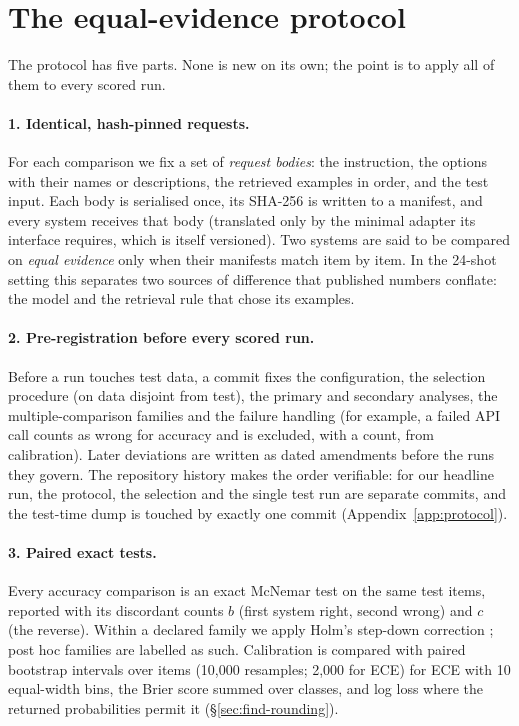 \section{The equal-evidence protocol}
\label{sec:protocol}

The protocol has five parts. None is new on its own; the point is to apply all of them to every scored run.

\paragraph{1. Identical, hash-pinned requests.} For each comparison we fix a set of \emph{request bodies}: the
instruction, the options with their names or descriptions, the retrieved examples in order, and the test input. Each
body is serialised once, its SHA-256 is written to a manifest, and every system receives that body (translated only
by the minimal adapter its interface requires, which is itself versioned). Two systems are said to be compared on
\emph{equal evidence} only when their manifests match item by item. In the 24-shot setting this separates two
sources of difference that published numbers conflate: the model and the retrieval rule that chose its examples.

\paragraph{2. Pre-registration before every scored run.} Before a run touches test data, a commit fixes the
configuration, the selection procedure (on data disjoint from test), the primary and secondary analyses, the
multiple-comparison families and the failure handling (for example, a failed API call counts as wrong for accuracy
and is excluded, with a count, from calibration). Later deviations are written as dated amendments before the runs
they govern. The repository history makes the order verifiable: for our headline run, the protocol, the selection
and the single test run are separate commits, and the test-time dump is touched by exactly one commit
(Appendix~\ref{app:protocol}).

\paragraph{3. Paired exact tests.} Every accuracy comparison is an exact McNemar test on the same test items,
reported with its discordant counts $b$ (first system right, second wrong) and $c$ (the reverse). Within a declared
family we apply Holm's step-down correction \citep{holm-1979-simple}; post hoc families are labelled as such. Calibration is compared with
paired bootstrap intervals over items (10,000 resamples; 2,000 for ECE) %
for ECE with 10 equal-width bins, the Brier score \citep{brier-1950-verification} summed over classes, and log loss where the returned probabilities permit
it (\S\ref{sec:find-rounding}).

